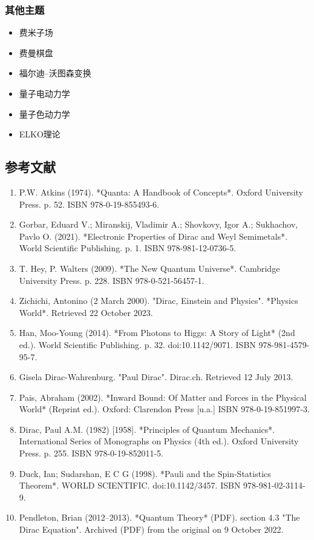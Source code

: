 \subsubsection{其他主题}
\begin{itemize}
\item 费米子场
\item 费曼棋盘
\item 福尔迪–沃图森变换
\item 量子电动力学
\item 量子色动力学
\item ELKO理论
\end{itemize}
\subsection{参考文献}
\begin{enumerate}
\item P.W. Atkins (1974). *Quanta: A Handbook of Concepts*. Oxford University Press. p. 52. ISBN 978-0-19-855493-6.
\item Gorbar, Eduard V.; Miranskij, Vladimir A.; Shovkovy, Igor A.; Sukhachov, Pavlo O. (2021). *Electronic Properties of Dirac and Weyl Semimetals*. World Scientific Publishing. p. 1. ISBN 978-981-12-0736-5.
\item T. Hey, P. Walters (2009). *The New Quantum Universe*. Cambridge University Press. p. 228. ISBN 978-0-521-56457-1.
\item Zichichi, Antonino (2 March 2000). "Dirac, Einstein and Physics". *Physics World*. Retrieved 22 October 2023.
\item Han, Moo-Young (2014). *From Photons to Higgs: A Story of Light* (2nd ed.). World Scientific Publishing. p. 32. doi:10.1142/9071. ISBN 978-981-4579-95-7.
\item Gisela Dirac-Wahrenburg. "Paul Dirac". Dirac.ch. Retrieved 12 July 2013.
\item Pais, Abraham (2002). *Inward Bound: Of Matter and Forces in the Physical World* (Reprint ed.). Oxford: Clarendon Press [u.a.] ISBN 978-0-19-851997-3.
\item Dirac, Paul A.M. (1982) [1958]. *Principles of Quantum Mechanics*. International Series of Monographs on Physics (4th ed.). Oxford University Press. p. 255. ISBN 978-0-19-852011-5.
\item Duck, Ian; Sudarshan, E C G (1998). *Pauli and the Spin-Statistics Theorem*. WORLD SCIENTIFIC. doi:10.1142/3457. ISBN 978-981-02-3114-9.
\item Pendleton, Brian (2012–2013). *Quantum Theory* (PDF). section 4.3 "The Dirac Equation". Archived (PDF) from the original on 9 October 2022.

\end{enumerate}

